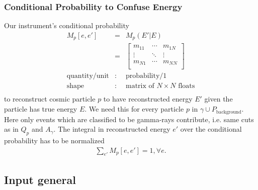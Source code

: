 \documentclass{article}%
\begin{document}
            \subsubsection*{Conditional Probability to Confuse Energy}
                Our instrument's conditional probability
                \begin{eqnarray*}
                    M_p[e, e'] &=& M_p(E' \vert E)\\
                    &=&
                      \left[ {\begin{array}{ccc}
                        m_{11} & \cdots & m_{1N}\\
                        \vdots & \ddots & \vdots\\
                        m_{N1} & \cdots & m_{NN}\\
                      \end{array} } \right]\\
                    \text{quantity}/\text{unit} &:& \text{probability}/1\\
                    \text{shape} &:& \text{matrix of}\,\,N \times N \,\,\text{floats}\\
                \end{eqnarray*}
                to reconstruct cosmic particle $p$ to have reconstructed energy $E'$ given the particle has true energy $E$.
                We need this for every particle $p$ in $\gamma \cup P_\text{background}$.
                Here only events which are classified to be gamma-rays contribute, i.e. same cuts as in $Q_p$ and $A_\gamma$.
                The integral in reconstructed energy $e'$ over the conditional probability has to be normalized
                \begin{eqnarray*}
                    \sum_{e'} M_p[e, e'] = 1, \forall e.
                \end{eqnarray*}
        \subsection{Input general}
\end{document}
